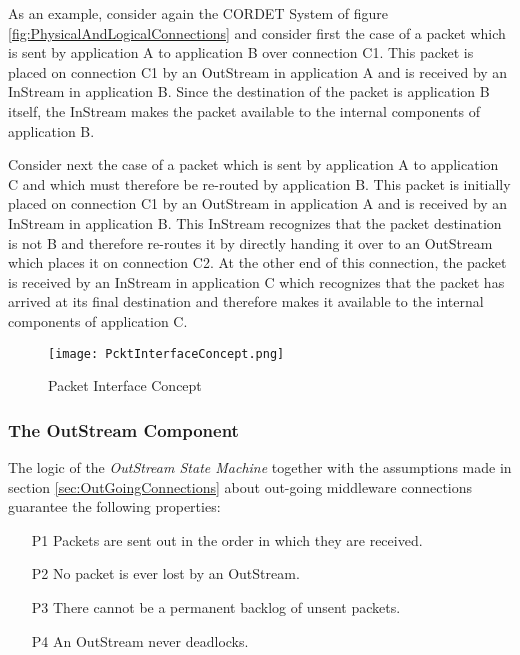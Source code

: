 \documentclass{pnp_article}
\begin{document}
As an example, consider again the CORDET System of figure \ref{fig:PhysicalAndLogicalConnections} and consider first the case of a packet which is sent by application A to application B over connection C1. This packet is placed on connection C1 by an OutStream in application A and is received by an InStream in application B. Since the destination of the packet is application B itself, the InStream makes the packet available to the internal components of application B.

Consider next the case of a packet which is sent by application A to application C and which must therefore be re-routed by application B. This packet is initially placed on connection C1 by an OutStream in application A and is received by an InStream in application B. This InStream recognizes that the packet destination is not B and therefore re-routes it by directly handing it over to an OutStream which places it on connection C2. At the other end of this connection, the packet is received by an InStream in application C which recognizes that the packet has arrived at its final destination and therefore makes it available to the internal components of application C. 

\begin{figure}[ht]
 \centering
 \texttt{[image: PcktInterfaceConcept.png]}
 \caption{Packet Interface Concept}
 \label{fig:PcktInterfaceConcept}
\end{figure}

\subsubsection{The OutStream Component}\label{sec:OutStream}


The logic of the \textit{OutStream State Machine} together with the assumptions made in section \ref{sec:OutGoingConnections} about out-going middleware connections guarantee the following properties:

\begin{itemize}
\item[P1]{Packets are sent out in the order in which they are received.}
\item[P2]{No packet is ever lost by an OutStream.}
\item[P3]{There cannot be a permanent backlog of unsent packets.}
\item[P4]{An OutStream never deadlocks.}
\end{itemize}
\end{document}
